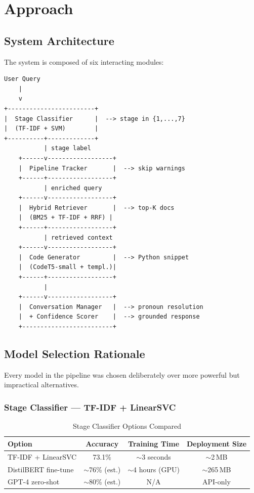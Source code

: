\documentclass[12pt,a4paper]{article}
\begin{document}
\section{Approach}

\subsection{System Architecture}

The system is composed of six interacting modules:

\begin{lstlisting}[language={}]
User Query
    |
    v
+------------------------+
|  Stage Classifier      |  --> stage in {1,...,7}
|  (TF-IDF + SVM)        |
+----------+-------------+
           | stage label
    +------v------------------+
    |  Pipeline Tracker       |  --> skip warnings
    +------+------------------+
           | enriched query
    +------v------------------+
    |  Hybrid Retriever       |  --> top-K docs
    |  (BM25 + TF-IDF + RRF) |
    +------+------------------+
           | retrieved context
    +------v------------------+
    |  Code Generator         |  --> Python snippet
    |  (CodeT5-small + templ.)|
    +------+------------------+
           |
    +------v------------------+
    |  Conversation Manager   |  --> pronoun resolution
    |  + Confidence Scorer    |  --> grounded response
    +-------------------------+
\end{lstlisting}

\subsection{Model Selection Rationale}

Every model in the pipeline was chosen deliberately over more powerful but impractical alternatives.

\subsubsection{Stage Classifier --- TF-IDF + LinearSVC}

\begin{table}[h!]
\centering
\caption{Stage Classifier Options Compared}
\begin{tabular}{lccc}
\toprule
Option & Accuracy & Training Time & Deployment Size \\
\midrule
TF-IDF + LinearSVC & 73.1\% & $\sim$3 seconds & $\sim$2\,MB \\
DistilBERT fine-tune & $\sim$76\% (est.) & $\sim$4 hours (GPU) & $\sim$265\,MB \\
GPT-4 zero-shot & $\sim$80\% (est.) & N/A & API-only \\
\bottomrule
\end{tabular}
\end{table}
\end{document}
